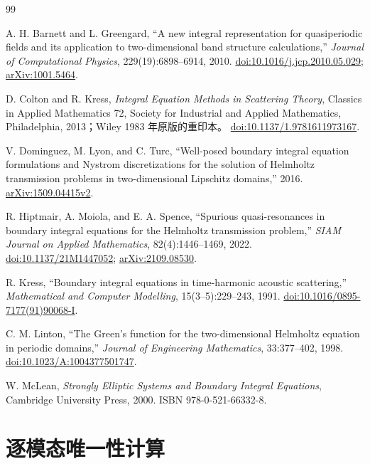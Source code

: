 \documentclass[UTF8,11pt,fontset=fandol]{ctexart}
\theoremstyle{plain}
\theoremstyle{definition}
\theoremstyle{remark}
\begin{document}
\begin{thebibliography}{99}

A. H. Barnett and L. Greengard,
``A new integral representation for quasiperiodic fields and its application
to two-dimensional band structure calculations,''
\emph{Journal of Computational Physics}, 229(19):6898--6914, 2010.
\href{https://doi.org/10.1016/j.jcp.2010.05.029}{doi:10.1016/j.jcp.2010.05.029};
\href{https://arxiv.org/abs/1001.5464}{arXiv:1001.5464}.

D. Colton and R. Kress,
\emph{Integral Equation Methods in Scattering Theory},
Classics in Applied Mathematics 72, Society for Industrial and Applied
Mathematics, Philadelphia, 2013；Wiley 1983 年原版的重印本。
\href{https://doi.org/10.1137/1.9781611973167}{doi:10.1137/1.9781611973167}.

V. Dominguez, M. Lyon, and C. Turc,
``Well-posed boundary integral equation formulations and Nystrom
discretizations for the solution of Helmholtz transmission problems in
two-dimensional Lipschitz domains,'' 2016.
\href{https://arxiv.org/abs/1509.04415}{arXiv:1509.04415v2}.

R. Hiptmair, A. Moiola, and E. A. Spence,
``Spurious quasi-resonances in boundary integral equations for the Helmholtz
transmission problem,'' \emph{SIAM Journal on Applied Mathematics},
82(4):1446--1469, 2022.
\href{https://doi.org/10.1137/21M1447052}{doi:10.1137/21M1447052};
\href{https://arxiv.org/abs/2109.08530}{arXiv:2109.08530}.

R. Kress,
``Boundary integral equations in time-harmonic acoustic scattering,''
\emph{Mathematical and Computer Modelling}, 15(3--5):229--243, 1991.
\href{https://doi.org/10.1016/0895-7177(91)90068-I}{doi:10.1016/0895-7177(91)90068-I}.

C. M. Linton,
``The Green's function for the two-dimensional Helmholtz equation in periodic
domains,'' \emph{Journal of Engineering Mathematics}, 33:377--402, 1998.
\href{https://doi.org/10.1023/A:1004377501747}{doi:10.1023/A:1004377501747}.

W. McLean,
\emph{Strongly Elliptic Systems and Boundary Integral Equations},
Cambridge University Press, 2000. ISBN 978-0-521-66332-8.

\end{thebibliography}

\appendix
\section{逐模态唯一性计算}
\end{document}

